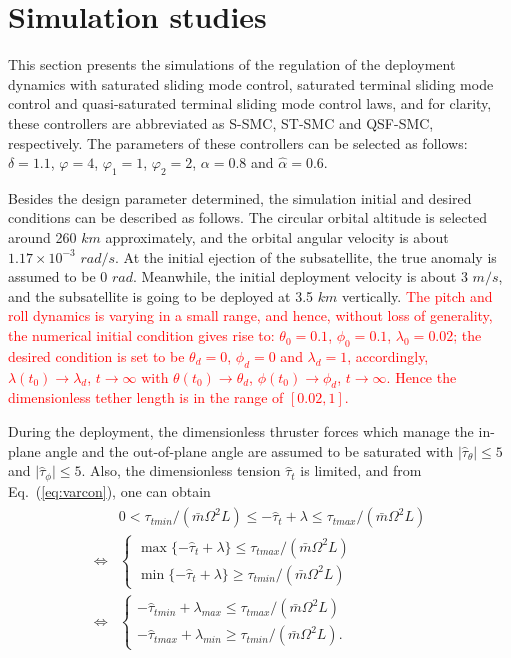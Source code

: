\documentclass[3p]{elsarticle}
\theoremstyle{plain}
\theoremstyle{remark}
\begin{document}
\section{Simulation studies}\label{sec:4}
This section presents the simulations of the regulation of the deployment dynamics with saturated sliding mode control, saturated terminal sliding mode control and quasi-saturated terminal sliding mode control laws, and for clarity, these controllers are abbreviated as S-SMC, ST-SMC and QSF-SMC, respectively. The parameters of these controllers can be selected as follows: $\delta=1.1$, $\varphi= 4$, $\varphi_1 = 1$, $\varphi_2= 2$, $\alpha = 0.8$ and $\hat\alpha=0.6$.\par
Besides the design parameter determined, the simulation initial and desired conditions can be described as follows. The circular orbital altitude is selected around 260 $km$ approximately, and the orbital angular velocity is about $1.17\times 10^{-3}$ $rad/s$. At the initial ejection of the subsatellite, the true anomaly is assumed to be 0 $rad$. Meanwhile, the initial deployment velocity is about 3 $m/s$, and the subsatellite is going to be deployed at 3.5 $km$ vertically. \textcolor{red}{The pitch and roll dynamics is varying in a small range, and hence, without loss of generality, the numerical initial condition gives rise to: $\theta_0 = 0.1$, $\phi_0 = 0.1$, $\lambda_0 = 0.02$; the desired condition is set to be $\theta_d = 0$, $\phi_d = 0$ and $\lambda_d = 1$, accordingly, $\lambda(t_0)\rightarrow\lambda_d$, $t\rightarrow\infty$ with $\theta(t_0)\rightarrow\theta_d$, $\phi(t_0)\rightarrow\phi_d$, $t\rightarrow\infty$. Hence the dimensionless tether length is in the range of $[0.02,1]$.}\par
During the deployment, the dimensionless thruster forces which manage the in-plane angle and the out-of-plane angle are assumed to be saturated with $\vert\hat\tau_{\theta}\vert\le5 $ and $\vert\hat\tau_{\phi}\vert\le 5$. Also, the dimensionless tension $\hat\tau_t$ is limited, and from Eq.~(\ref{eq:varcon}), one can obtain
\begin{align}
\begin{split}
&0<\tau_{tmin}/(\bar{m}\Omega^2L)\le-\hat\tau_t+\lambda\le\tau_{tmax}/(\bar{m}\Omega^2L)\\
\Leftrightarrow
&\begin{cases}
\max\{-\hat\tau_t+\lambda\}\le\tau_{tmax}/(\bar{m}\Omega^2L)\\
\min\{-\hat\tau_t+\lambda\}\ge\tau_{tmin}/(\bar{m}\Omega^2L)
\end{cases}\\
\Leftrightarrow
&\begin{cases}
-\hat\tau_{tmin}+\lambda_{max}\le\tau_{tmax}/(\bar{m}\Omega^2L)\\
-\hat\tau_{tmax}+\lambda_{min}\ge\tau_{tmin}/(\bar{m}\Omega^2L).
\end{cases}
\end{split}
\end{align}
\end{document}
